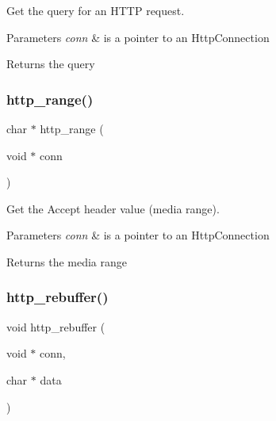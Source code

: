 Get the query for an H\+T\+TP request. 


\begin{DoxyParams}{Parameters}
{\em conn} & is a pointer to an Http\+Connection \\
\hline
\end{DoxyParams}
\begin{DoxyReturn}{Returns}
the query 
\end{DoxyReturn}
\mbox{\label{group__http__connection_ga5e069d5d6ad16d184f959507c7e3bea8}} 
\subsubsection{\texorpdfstring{http\+\_\+range()}{http\_range()}}
{\footnotesize\ttfamily char $\ast$ http\+\_\+range (\begin{DoxyParamCaption}\item[{void $\ast$}]{conn }\end{DoxyParamCaption})}



Get the Accept header value (media range). 


\begin{DoxyParams}{Parameters}
{\em conn} & is a pointer to an Http\+Connection \\
\hline
\end{DoxyParams}
\begin{DoxyReturn}{Returns}
the media range 
\end{DoxyReturn}
\mbox{\label{group__http__connection_ga5150a5e062ed872568f6666ce8859baa}} 
\subsubsection{\texorpdfstring{http\+\_\+rebuffer()}{http\_rebuffer()}}
{\footnotesize\ttfamily void http\+\_\+rebuffer (\begin{DoxyParamCaption}\item[{void $\ast$}]{conn,  }\item[{char $\ast$}]{data }\end{DoxyParamCaption})}



